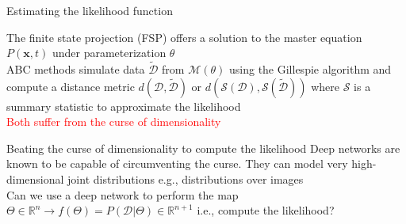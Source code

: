 \documentclass[aspectratio=1610]{beamer}					%
\begin{document}
\begin{frame}{Estimating the likelihood function}

The finite state projection (FSP) offers a solution to the master equation $P(\mathbf{x},t)$ under parameterization $\theta$\\
\vspace{0.2in}
ABC methods simulate data $\tilde{\mathcal{D}}$ from $\mathcal{M}(\theta)$ using the Gillespie algorithm and compute a distance metric $d(\mathcal{D},\tilde{\mathcal{D}})$ or $d(\mathcal{S}(\mathcal{D}),\mathcal{S}(\tilde{\mathcal{D}}))$ where $\mathcal{S}$ is a summary statistic to approximate the likelihood\\
\vspace{0.2in}
\textcolor{red}{Both suffer from the curse of dimensionality}\\
\vspace{0.2in}

\end{frame}

\begin{frame}{Beating the curse of dimensionality to compute the likelihood}
Deep networks are known to be capable of circumventing the curse. They can model very high-dimensional joint distributions e.g., distributions over images\\
\vspace{0.2in}
Can we use a deep network to perform the map $\Theta\in \mathbb{R}^{n} \rightarrow f(\Theta) = P(\mathcal{D}|\Theta) \in \mathbb{R}^{n+1}$ i.e., compute the likelihood?
\end{frame}
\end{document}
